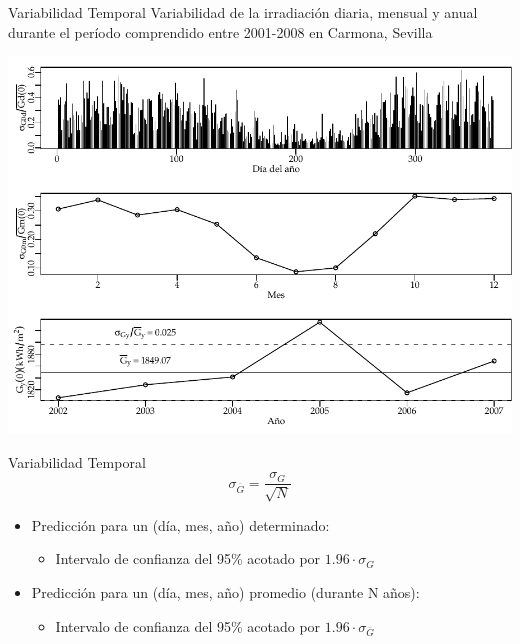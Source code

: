 \documentclass[xcolor={usenames,svgnames,dvipsnames}]{beamer}
\begin{document}
\begin{frame}[label={sec:orgaf90afc}]{Variabilidad Temporal}
Variabilidad de la irradiación diaria, mensual y anual durante el período comprendido entre 2001-2008 en Carmona, Sevilla
\begin{center}
\includegraphics[width=.9\linewidth]{../figs/VariabilidadRadiacionDiario.pdf}
\end{center}

\nocite{Perpinan2009}
\end{frame}

\begin{frame}[label={sec:orgba944b7}]{Variabilidad Temporal}
\[
\sigma_{\overline{G}}=\frac{\sigma_{G}}{\sqrt{N}}
\]

\begin{itemize}
\item Predicción para un (día, mes, año) \alert{determinado}: 

\begin{itemize}
\item Intervalo de confianza del 95\% acotado por \(1.96\cdot\sigma_{G}\)
\end{itemize}

\item Predicción para un (día, mes, año) \alert{promedio (durante N años)}: 

\begin{itemize}
\item Intervalo de confianza del 95\% acotado por \(1.96\cdot\sigma_{\overline{G}}\)
\end{itemize}
\end{itemize}
\end{frame}
\end{document}
